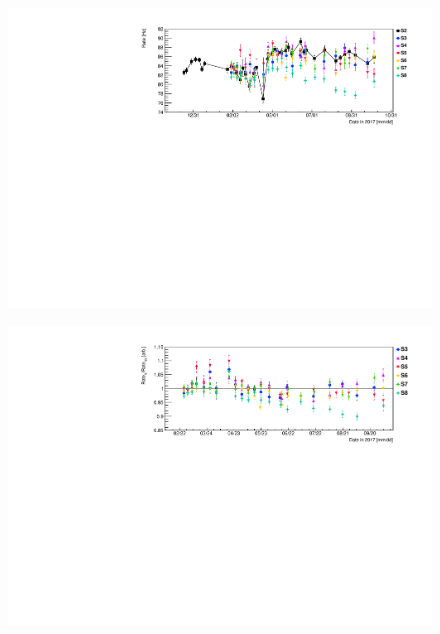 \begin{figure}[H]
	\centering
	\includegraphics[width=1\linewidth]{tex/6-ac227-images/BNL/RateVsTime_AllSamples}
	\caption{}
	\label{fig:ratevstimeallsamples}
\end{figure}

\begin{figure}[H]
	\centering
	\includegraphics[width=1\linewidth]{tex/6-ac227-images/BNL/RelRateVsTime_AllSamples}
	\caption{}
	\label{fig:relratevstimeallsamples}
\end{figure}

